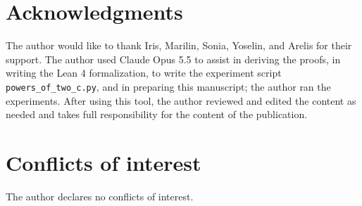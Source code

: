 \documentclass[11pt]{amsart}
\theoremstyle{definition}
\begin{document}
\section*{Acknowledgments}
The author would like to thank Iris, Marilin, Sonia, Yoselin, and Arelis for their support. The author used Claude Opus 5.5 to assist in deriving the proofs, in writing the Lean 4 formalization, to write the experiment script \texttt{powers\_of\_two\_c.py}, and in preparing this manuscript; the author ran the experiments. After using this tool, the author reviewed and edited the content as needed and takes full responsibility for the content of the publication.

\section*{Conflicts of interest}
The author declares no conflicts of interest.



\end{document}
